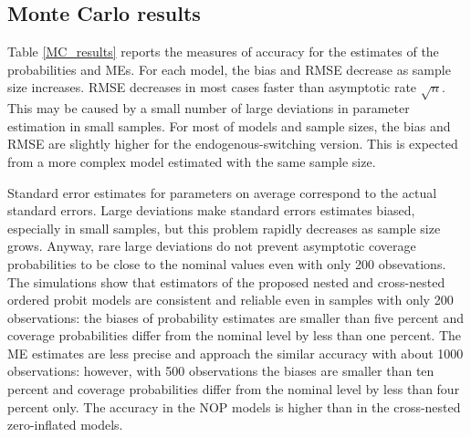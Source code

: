 \documentclass[letterpaper,fleqn,12pt]{article}
\begin{document}
\begin{onehalfspace}
\subsection{Monte Carlo results}

Table \ref{MC_results} reports the measures of accuracy for the estimates of
the probabilities and MEs. For each model, the bias and RMSE decrease as
sample size increases. RMSE decreases in most cases faster than asymptotic
rate $\sqrt{n}$. This may be caused by a small number of large deviations in
parameter estimation in small samples. For most of models and sample sizes,
the bias and RMSE are slightly higher for the endogenous-switching version.
This is expected from a more complex model estimated with the same sample
size.

Standard error estimates for parameters on average correspond to the actual
standard errors. Large deviations make standard errors estimates biased,
especially in small samples, but this problem rapidly decreases as sample
size grows. Anyway, rare large deviations do not prevent asymptotic coverage
probabilities to be close to the nominal values even with only 200
obsevations. The simulations show that estimators of the proposed nested and
cross-nested ordered probit models are consistent and reliable even in
samples with only 200 observations: the biases of probability estimates are
smaller than five percent and coverage probabilities differ from the nominal
level by less than one percent. The ME estimates are less precise and
approach the similar accuracy with about 1000 observations: however, with
500 observations the biases are smaller than ten percent and coverage
probabilities differ from the nominal level by less than four percent only.
The accuracy in the NOP models is higher than in the cross-nested
zero-inflated models.

\end{onehalfspace}%
\end{document}
